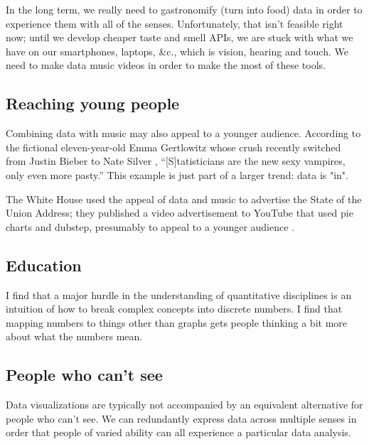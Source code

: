 \documentclass{acm_proc_article-sp}
\begin{document}
In the long term, we really need to gastronomify (turn into food)
data in order to experience them with all of the senses.
Unfortunately, that isn't feasible right now;
until we develop cheaper taste and smell APIs, we are stuck with what we have
on our smartphones, laptops, \&c., which is vision, hearing and touch. We need
to make data music videos in order to make the most of these tools.

\subsection{Reaching young people}
Combining data with music may also appeal to a younger audience.
According to the fictional eleven-year-old Emma Gertlowitz whose crush
recently switched from Justin Bieber to Nate Silver \cite{emma},
``[S]tatisticians are the new sexy vampires, only even more pasty.''
This example is just part of a larger trend: data is "in".

The White House used the appeal of data and music to advertise the State
of the Union Address; they published a video advertisement to YouTube that
used pie charts and dubstep, presumably to appeal to a younger audience \cite{whitehouse}.

\subsection{Education}
I find that a major hurdle in the understanding of quantitative disciplines
is an intuition of how to break complex concepts into discrete numbers.
I find that mapping numbers to things other than graphs gets people thinking
a bit more about what the numbers mean.

\subsection{People who can't see}
Data visualizations are typically not accompanied by an equivalent
alternative for people who can't see. We can redundantly express data
across multiple senses in order that people of varied ability can all
experience a particular data analysis.



\balancecolumns
\end{document}

